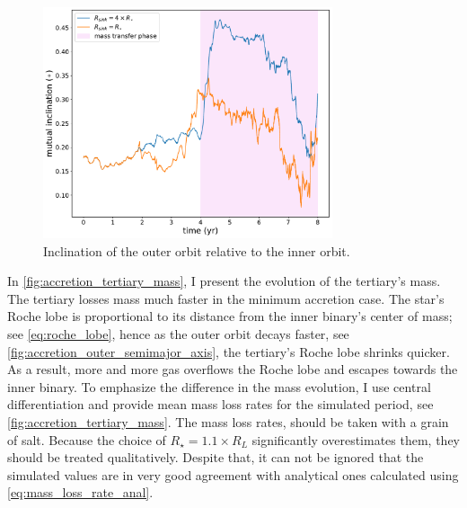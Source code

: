\begin{figure}[!htb]
    \centering
    \includegraphics[width=0.76\textwidth]{Thesis/graphs/accretion_case/accretion_inc.pdf}
    \caption{Inclination of the outer orbit relative to the inner orbit.}
    \label{fig:accretion_inc}
\end{figure}
In \cref{fig:accretion_tertiary_mass}, I present the evolution of the tertiary's mass. The tertiary losses mass much faster in the minimum accretion case. The star's Roche lobe is proportional to its distance from the inner binary's center of mass; see \cref{eq:roche_lobe}, hence as the outer orbit decays faster, see \cref{fig:accretion_outer_semimajor_axis}, the tertiary's Roche lobe shrinks quicker. As a result, more and more gas overflows the Roche lobe and escapes towards the inner binary. To emphasize the difference in the mass evolution, I use central differentiation and provide mean mass loss rates for the simulated period, see \cref{fig:accretion_tertiary_mass}. The mass loss rates, should be taken with a grain of salt. Because the choice of $R_{\star} = 1.1 \times R_L$ significantly overestimates them, they should be treated qualitatively. Despite that, it can not be ignored that the simulated values are in very good agreement with analytical ones calculated using \cref{eq:mass_loss_rate_anal}.
